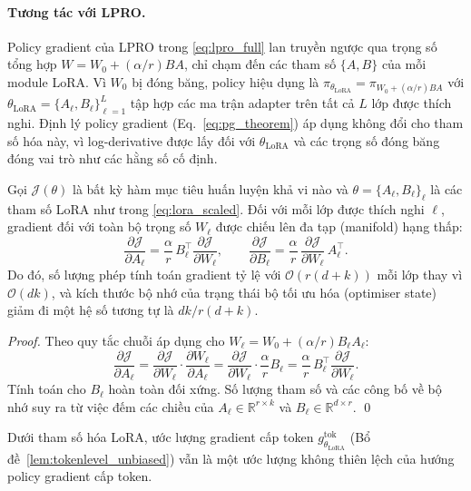 \documentclass[11pt,a4paper]{article}
\begin{document}
\paragraph{Tương tác với LPRO.} Policy gradient của LPRO trong
\eqref{eq:lpro_full} lan truyền ngược qua trọng số tổng hợp \(W = W_0 + ({\alpha}/{r})BA\),
chỉ chạm đến các tham số \(\{A, B\}\) của mỗi module LoRA. Vì \(W_0\) bị
đóng băng, policy hiệu dụng là
\(\pi_{\theta_{\text{LoRA}}} = \pi_{W_0 + ({\alpha}/{r})BA}\) với
\(\theta_{\text{LoRA}} = \{A_\ell, B_\ell\}_{\ell=1}^L\) tập hợp các ma trận
adapter trên tất cả \(L\) lớp được thích nghi. Định lý policy gradient
(Eq.~\eqref{eq:pg_theorem}) áp dụng không đổi cho tham số hóa này, vì
log-derivative được lấy đối với \(\theta_{\text{LoRA}}\) và các trọng số đóng băng
đóng vai trò như các hằng số cố định.

\begin{lemma}\label{lem:lora_grad}
Gọi \(\mathcal{J}(\theta)\) là bất kỳ hàm mục tiêu huấn luyện khả vi nào và
\(\theta = \{A_\ell, B_\ell\}_\ell\) là các tham số LoRA như trong
\eqref{eq:lora_scaled}. Đối với mỗi lớp được thích nghi \(\ell\), gradient đối với
toàn bộ trọng số \(W_\ell\) được chiếu lên đa tạp (manifold) hạng thấp:
\[
  \frac{\partial \mathcal{J}}{\partial A_\ell} = \frac{\alpha}{r}\,B_\ell^\top
  \frac{\partial \mathcal{J}}{\partial W_\ell},
  \qquad
  \frac{\partial \mathcal{J}}{\partial B_\ell} = \frac{\alpha}{r}\,
  \frac{\partial \mathcal{J}}{\partial W_\ell}\,A_\ell^\top.
\]
Do đó, số lượng phép tính toán gradient tỷ lệ với \(\mathcal{O}(r(d+k))\)
mỗi lớp thay vì \(\mathcal{O}(dk)\), và kích thước bộ nhớ của
trạng thái bộ tối ưu hóa (optimiser state) giảm đi một hệ số tương tự là \(dk/r(d+k)\).
\end{lemma}

\begin{proof}
Theo quy tắc chuỗi áp dụng cho \(W_\ell = W_0 + ({\alpha}/{r})B_\ell A_\ell\):
\[
  \frac{\partial \mathcal{J}}{\partial A_\ell}
  = \frac{\partial \mathcal{J}}{\partial W_\ell} \cdot
    \frac{\partial W_\ell}{\partial A_\ell}
  = \frac{\partial \mathcal{J}}{\partial W_\ell} \cdot \frac{\alpha}{r} B_\ell
  = \frac{\alpha}{r}\,B_\ell^\top \frac{\partial \mathcal{J}}{\partial W_\ell}.
\]
Tính toán cho \(B_\ell\) hoàn toàn đối xứng. Số lượng tham số và các công bố về bộ nhớ
suy ra từ việc đếm các chiều của \(A_\ell \in \mathbb{R}^{r \times k}\) và
\(B_\ell \in \mathbb{R}^{d \times r}\). \qed
\end{proof}

\begin{lemma}\label{lem:lora_unbiased}
Dưới tham số hóa LoRA, ước lượng gradient cấp token
\(g^{\text{tok}}_{\theta_{\text{LoRA}}}\) (Bổ đề~\ref{lem:tokenlevel_unbiased})
vẫn là một ước lượng không thiên lệch của hướng policy gradient cấp token.
\end{lemma}
\end{document}
